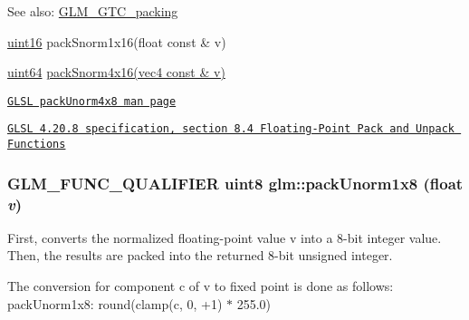 \begin{Desc}
\item[See also:]\hyperlink{group__gtc__packing}{GLM\_\-GTC\_\-packing} 

\hyperlink{group__gtc__type__precision_gd8c2939e1fdd8e5828b31d95c52255d5}{uint16} packSnorm1x16(float const \& v) 

\hyperlink{group__gtc__type__precision_ge3632bf9b37da66233d78930dd06378a}{uint64} \hyperlink{group__gtc__packing_g9b237d7c66b7a71964e6d1f4dc06539f}{packSnorm4x16(vec4 const \& v)} 

\href{http://www.opengl.org/sdk/docs/manglsl/xhtml/packUnorm4x8.xml}{\tt GLSL packUnorm4x8 man page} 

\href{http://www.opengl.org/registry/doc/GLSLangSpec.4.20.8.pdf}{\tt GLSL 4.20.8 specification, section 8.4 Floating-Point Pack and Unpack Functions} \end{Desc}
\hypertarget{group__gtc__packing_g2f9963e5d762b10085b280d3662017ba}{
\subsubsection[packUnorm1x8]{\setlength{\rightskip}{0pt plus 5cm}GLM\_\-FUNC\_\-QUALIFIER uint8 glm::packUnorm1x8 (float {\em v})}}
\label{group__gtc__packing_g2f9963e5d762b10085b280d3662017ba}


First, converts the normalized floating-point value v into a 8-bit integer value. Then, the results are packed into the returned 8-bit unsigned integer.

The conversion for component c of v to fixed point is done as follows: packUnorm1x8: round(clamp(c, 0, +1) $\ast$ 255.0)

